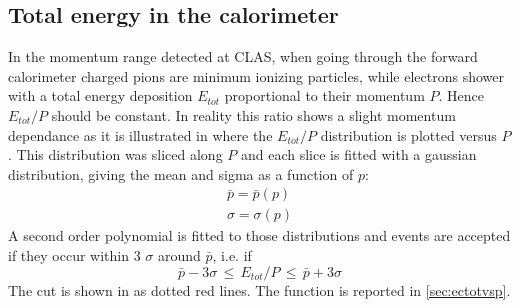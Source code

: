 \subsection{Total energy in the calorimeter}
In the momentum range detected at CLAS, when going through the forward calorimeter
charged pions are minimum ionizing particles, while electrons shower with a total energy 
deposition $E_{tot}$ proportional to their momentum $P$. 
Hence $E_{tot}/P$ should be constant. In reality this ratio shows a slight momentum dependance as
it is illustrated in  where 
the $E_{tot}/P$ distribution is plotted versus $P$.
This distribution was sliced along $P$ and each slice is
fitted with a gaussian distribution, giving the mean and sigma as a function
of $p$:
$$
\begin{array}{l}
\bar{p} = \bar{p}(p) \\
\sigma = \sigma (p)
\end{array}
$$
A second order polynomial is fitted to those distributions and
events are accepted if they occur within 3 $\sigma$  around $\bar{p}$, i.e. if
$$
 \bar{p} - 3\sigma \,\le\, E_{tot}/P \,\le\, \bar{p} + 3\sigma
$$
The cut is shown in  as dotted red lines. The function is reported in \ref{sec:ectotvsp}.

